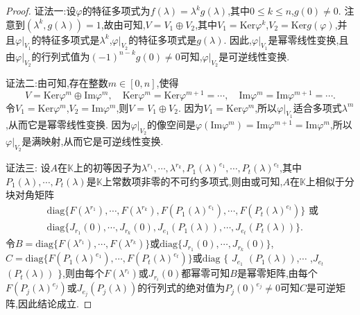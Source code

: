 \documentclass[../../main.tex]{subfiles}
\begin{document}
\begin{proof}
{\color{blue}证法一:}设$\varphi$的特征多项式为$f(\lambda)=\lambda^kg(\lambda)$,其中$0\leqslant k\leqslant n$,$g(0)\neq 0$. 注意到$(\lambda^k,g(\lambda)) = 1$,故由可知,$V = V_1\oplus V_2$,其中$V_1=\mathrm{Ker}\varphi^k$,$V_2=\mathrm{Ker}g(\varphi)$,并且$\varphi|_{V_1}$的特征多项式是$\lambda^k$,$\varphi|_{V_2}$的特征多项式是$g(\lambda)$. 因此,$\varphi|_{V_1}$是幂零线性变换,且由$\varphi|_{V_2}$的行列式值为$(-1)^{n - k}g(0)\neq 0$可知,$\varphi|_{V_2}$是可逆线性变换.

{\color{blue}证法二:}由可知,存在整数$m\in[0,n]$,使得
\[V=\mathrm{Ker}\varphi^m\oplus\mathrm{Im}\varphi^m,\quad \mathrm{Ker}\varphi^m=\mathrm{Ker}\varphi^{m + 1}=\cdots,\quad \mathrm{Im}\varphi^m=\mathrm{Im}\varphi^{m + 1}=\cdots.\]
令$V_1=\mathrm{Ker}\varphi^m$,$V_2=\mathrm{Im}\varphi^m$,则$V = V_1\oplus V_2$. 因为$V_1=\mathrm{Ker}\varphi^m$,所以$\varphi|_{V_1}$适合多项式$\lambda^m$,从而它是幂零线性变换. 因为$\varphi|_{V_2}$的像空间是$\varphi(\mathrm{Im}\varphi^m)=\mathrm{Im}\varphi^{m + 1}=\mathrm{Im}\varphi^m$,所以$\varphi|_{V_2}$是满映射,从而它是可逆线性变换. 

{\color{blue}证法三:}
设$A$在$\mathbb{K}$上的初等因子为$\lambda^{r_1},\cdots,\lambda^{r_k},P_1(\lambda)^{e_1},\cdots,P_t(\lambda)^{e_t}$,其中$P_1(\lambda),\cdots,P_t(\lambda)$是$\mathbb{K}$上常数项非零的不可约多项式,则由或可知,$A$在$\mathbb{K}$上相似于分块对角矩阵
\begin{align*}
&\mathrm{diag}\{F(\lambda^{r_1}),\cdots,F(\lambda^{r_k}),F(P_1(\lambda)^{e_1}),\cdots,F(P_t(\lambda)^{e_t})\}\text{ 或 }\\
&\mathrm{diag}\{J_{r_1}(0),\cdots,J_{r_k}(0),J_{e_1}(P_1(\lambda)),\cdots,J_{e_t}(P_t(\lambda))\}.
\end{align*}
令$B = \mathrm{diag}\{F(\lambda^{r_1}),\cdots,F(\lambda^{r_k})\}$或$\mathrm{diag}\{J_{r_1}(0),\cdots,J_{r_k}(0)\}$,$C = \mathrm{diag}\{F(P_1(\lambda)^{e_1}),\cdots,F(P_t(\lambda)^{e_t})\}$或$\mathrm{diag}$ $\{$ $J_{e_1}$ $(P_1(\lambda))$,$\cdots$ ,$J_{e_t}$ $(P_t(\lambda))$ $\}$,则由每个$F(\lambda^{r_i})$或$J_{r_i}(0)$都幂零可知$B$是幂零矩阵,由每个$F(P_j(\lambda)^{e_j})$或$J_{e_j}(P_j(\lambda))$的行列式的绝对值为$P_j(0)^{e_j}\neq 0$可知$C$是可逆矩阵,因此结论成立.
\end{proof}

\vspace{0.5cm}
\end{document}
